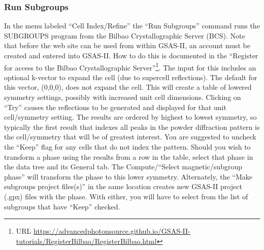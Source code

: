 \subsubsection{Run Subgroups}\label{ref:subgroups}
In the menu labeled ``Cell Index/Refine'' the ``Run Subgroups'' command runs the  SUBGROUPS program from the Bilbao Crystallographic Server (BCS). 
Note that before the web site can be used from within GSAS-II, an account must be created and entered into GSAS-II. How to do this is documented in the ``Register for access to the Bilbao Crystallographic Server''\footnote{URL \url{https://advancedphotonsource.github.io/GSAS-II-tutorials/RegisterBilbao/RegisterBilbao.html}}. The input for this includes an optional k-vector to expand the cell (due to supercell reflections). The default for this vector, (0,0,0), does not expand the cell. 
This will create a table of lowered symmetry settings, possibly with increased unit cell dimensions. Clicking on ``Try'' causes the reflections to be generated and displayed for that unit cell/symmetry setting. 
The results are ordered by highest to lowest symmetry, so typically the first result that indexes all peaks in the powder diffraction pattern is the cell/symmetry that will be of greatest interest. 
You are suggested to uncheck the ``Keep'' flag for any cells that do not index the pattern.  
Should you wish to transform a phase using the results from a row in the table, select that phase in the data tree and its General tab. The Compute/``Select magnetic/subgroup phase'' will transform the phase to this lower symmetry. Alternately, the ``Make subgroups project files(s)'' in the same location creates new GSAS-II project (.gpx) files with the phase. With either, you will have to select from the list of subgroups that have ``Keep'' checked. 


